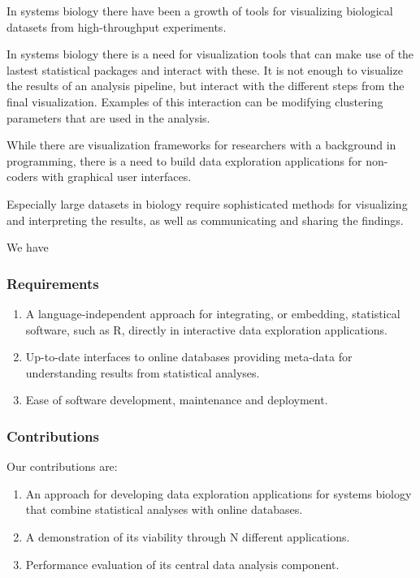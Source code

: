 In systems biology there have been a growth of tools for visualizing biological
datasets from high-throughput experiments.

In systems biology there is a need for visualization tools that can make use of
the lastest statistical packages and interact with these. It is not enough to
visualize the results of an analysis pipeline, but interact with the different
steps from the final visualization. Examples of this interaction can be
modifying clustering parameters that are used in the analysis.

While there are visualization frameworks for researchers with a background in
programming, there is a need to build data exploration applications for
non-coders with graphical user interfaces.

Especially large datasets in biology require sophisticated methods for
visualizing and interpreting the results, as well as communicating and sharing
the findings.   

We have 
\subsubsection*{Requirements} 
\begin{enumerate}
    \item A language-independent approach for integrating, or embedding,
        statistical software, such as R, directly in interactive data
        exploration applications.
    \item Up-to-date interfaces to online databases providing meta-data for
        understanding results from statistical analyses.
    \item Ease of software development, maintenance and deployment. 
\end{enumerate} 

\subsubsection*{Contributions} 
Our contributions are: 
\begin{enumerate}
\item An approach for developing data exploration applications for systems
biology that combine statistical analyses with online databases.  
\item A demonstration of its viability through N different applications. 
\item Performance evaluation of its central data analysis component. 
\end{enumerate} 


